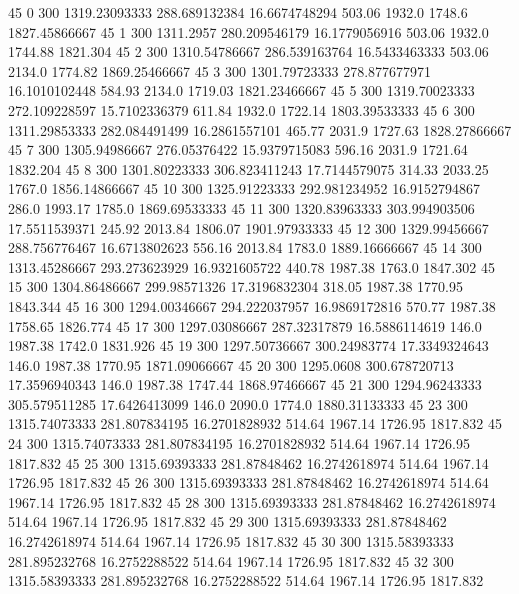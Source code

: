 45  0  300  1319.23093333  288.689132384  16.6674748294  503.06  1932.0  1748.6  1827.45866667 
45  1  300  1311.2957  280.209546179  16.1779056916  503.06  1932.0  1744.88  1821.304 
45  2  300  1310.54786667  286.539163764  16.5433463333  503.06  2134.0  1774.82  1869.25466667 
45  3  300  1301.79723333  278.877677971  16.1010102448  584.93  2134.0  1719.03  1821.23466667 
45  5  300  1319.70023333  272.109228597  15.7102336379  611.84  1932.0  1722.14  1803.39533333 
45  6  300  1311.29853333  282.084491499  16.2861557101  465.77  2031.9  1727.63  1828.27866667 
45  7  300  1305.94986667  276.05376422  15.9379715083  596.16  2031.9  1721.64  1832.204 
45  8  300  1301.80223333  306.823411243  17.7144579075  314.33  2033.25  1767.0  1856.14866667 
45  10  300  1325.91223333  292.981234952  16.9152794867  286.0  1993.17  1785.0  1869.69533333 
45  11  300  1320.83963333  303.994903506  17.5511539371  245.92  2013.84  1806.07  1901.97933333 
45  12  300  1329.99456667  288.756776467  16.6713802623  556.16  2013.84  1783.0  1889.16666667 
45  14  300  1313.45286667  293.273623929  16.9321605722  440.78  1987.38  1763.0  1847.302 
45  15  300  1304.86486667  299.98571326  17.3196832304  318.05  1987.38  1770.95  1843.344 
45  16  300  1294.00346667  294.222037957  16.9869172816  570.77  1987.38  1758.65  1826.774 
45  17  300  1297.03086667  287.32317879  16.5886114619  146.0  1987.38  1742.0  1831.926 
45  19  300  1297.50736667  300.24983774  17.3349324643  146.0  1987.38  1770.95  1871.09066667 
45  20  300  1295.0608  300.678720713  17.3596940343  146.0  1987.38  1747.44  1868.97466667 
45  21  300  1294.96243333  305.579511285  17.6426413099  146.0  2090.0  1774.0  1880.31133333 
45  23  300  1315.74073333  281.807834195  16.2701828932  514.64  1967.14  1726.95  1817.832 
45  24  300  1315.74073333  281.807834195  16.2701828932  514.64  1967.14  1726.95  1817.832 
45  25  300  1315.69393333  281.87848462  16.2742618974  514.64  1967.14  1726.95  1817.832 
45  26  300  1315.69393333  281.87848462  16.2742618974  514.64  1967.14  1726.95  1817.832 
45  28  300  1315.69393333  281.87848462  16.2742618974  514.64  1967.14  1726.95  1817.832 
45  29  300  1315.69393333  281.87848462  16.2742618974  514.64  1967.14  1726.95  1817.832 
45  30  300  1315.58393333  281.895232768  16.2752288522  514.64  1967.14  1726.95  1817.832 
45  32  300  1315.58393333  281.895232768  16.2752288522  514.64  1967.14  1726.95  1817.832 

